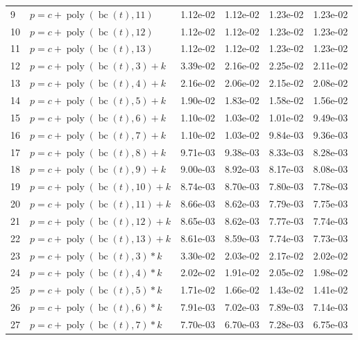 \documentclass[12pt,a4paper]{article}
\DeclareMathOperator{\bc}{bc}
\DeclareMathOperator{\poly}{poly}
\begin{document}
\begin{longtable}[t]{ll>{\raggedleft\arraybackslash}p{2cm}>{\raggedleft\arraybackslash}p{2cm}>{\raggedleft\arraybackslash}p{2cm}>{\raggedleft\arraybackslash}p{2cm}}
\rowcolor{gray!6}  9 & $p = c + \poly\left( \bc(t), 11 \right)$ & 1.12e-02 & 1.12e-02 & 1.23e-02 & 1.23e-02\\
10 & $p = c + \poly\left( \bc(t), 12 \right)$ & 1.12e-02 & 1.12e-02 & 1.23e-02 & 1.23e-02\\
\rowcolor{gray!6}  11 & $p = c + \poly\left( \bc(t), 13 \right)$ & 1.12e-02 & 1.12e-02 & 1.23e-02 & 1.23e-02\\
12 & $p = c + \poly\left( \bc(t), 3 \right) + k$ & 3.39e-02 & 2.16e-02 & 2.25e-02 & 2.11e-02\\
\rowcolor{gray!6}  13 & $p = c + \poly\left( \bc(t), 4 \right) + k$ & 2.16e-02 & 2.06e-02 & 2.15e-02 & 2.08e-02\\
14 & $p = c + \poly\left( \bc(t), 5 \right) + k$ & 1.90e-02 & 1.83e-02 & 1.58e-02 & 1.56e-02\\
\rowcolor{gray!6}  15 & $p = c + \poly\left( \bc(t), 6 \right) + k$ & 1.10e-02 & 1.03e-02 & 1.01e-02 & 9.49e-03\\
16 & $p = c + \poly\left( \bc(t), 7 \right) + k$ & 1.10e-02 & 1.03e-02 & 9.84e-03 & 9.36e-03\\
\rowcolor{gray!6}  17 & $p = c + \poly\left( \bc(t), 8 \right) + k$ & 9.71e-03 & 9.38e-03 & 8.33e-03 & 8.28e-03\\
18 & $p = c + \poly\left( \bc(t), 9 \right) + k$ & 9.00e-03 & 8.92e-03 & 8.17e-03 & 8.08e-03\\
\rowcolor{gray!6}  19 & $p = c + \poly\left( \bc(t), 10 \right) + k$ & 8.74e-03 & 8.70e-03 & 7.80e-03 & 7.78e-03\\
20 & $p = c + \poly\left( \bc(t), 11 \right) + k$ & 8.66e-03 & 8.62e-03 & 7.79e-03 & 7.75e-03\\
\rowcolor{gray!6}  21 & $p = c + \poly\left( \bc(t), 12 \right) + k$ & 8.65e-03 & 8.62e-03 & 7.77e-03 & 7.74e-03\\
22 & $p = c + \poly\left( \bc(t), 13 \right) + k$ & 8.61e-03 & 8.59e-03 & 7.74e-03 & 7.73e-03\\
\rowcolor{gray!6}  23 & $p = c + \poly\left( \bc(t), 3 \right) * k$ & 3.30e-02 & 2.03e-02 & 2.17e-02 & 2.02e-02\\
24 & $p = c + \poly\left( \bc(t), 4 \right) * k$ & 2.02e-02 & 1.91e-02 & 2.05e-02 & 1.98e-02\\
\rowcolor{gray!6}  25 & $p = c + \poly\left( \bc(t), 5 \right) * k$ & 1.71e-02 & 1.66e-02 & 1.43e-02 & 1.41e-02\\
26 & $p = c + \poly\left( \bc(t), 6 \right) * k$ & 7.91e-03 & 7.02e-03 & 7.89e-03 & 7.14e-03\\
\rowcolor{gray!6}  27 & $p = c + \poly\left( \bc(t), 7 \right) * k$ & 7.70e-03 & 6.70e-03 & 7.28e-03 & 6.75e-03\\

\end{longtable}
\end{document}
